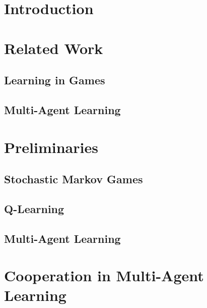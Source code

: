 \documentclass{article}
\begin{document}
\begin{multicols}{2}

\section{Introduction}



\section{Related Work}

\subsection{Learning in Games}

\subsection{Multi-Agent Learning}


\section{Preliminaries}

\subsection{Stochastic Markov Games}

\subsection{Q-Learning}

\subsection{Multi-Agent Learning}


\section{Cooperation in Multi-Agent Learning}


\end{multicols}
\end{document}
